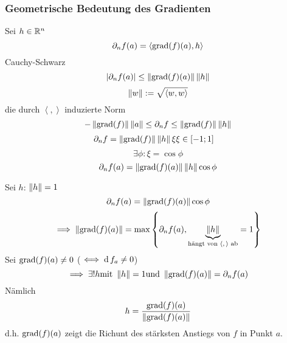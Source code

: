 \subsubsection{Geometrische Bedeutung des Gradienten}
\begin{Bem}
  Sei $h\in\mathbb{R}^n$
  \[\partial_n f(a)=\left\langle \operatorname{grad}(f)(a),h \right\rangle\]
  Cauchy-Schwarz
  \[\left| \partial_nf(a) \right|\leq\left\| \operatorname{grad}(f)(a) \right\|\left\| h \right\|\]
  \[\left\| w \right\|:=\sqrt{\left\langle w,w \right\rangle }\]
  die durch $\left\langle , \right\rangle$ induzierte Norm
  \[-\left\| \operatorname{grad}(f) \right\|\left\| a \right\|\leq \partial_n f\leq \left\| \operatorname{grad}(f) \right\|\left\| h \right\|\]
  \begin{align*}
    \partial_nf=\left\| \operatorname{grad}(f) \right\|\left\| h \right\|\xi&\xi\in [-1;1]
  \end{align*}
  \[\exists\phi:\xi=\cos\phi\]
  \[\partial_nf(a)=\left\| \operatorname{grad}(f)(a) \right\|\left\| h \right\|\cos \phi\]
\end{Bem}
\begin{Bem}
  Sei $h$: $\left\| h \right\|=1$
  \[\partial_nf(a)=\left\| \operatorname{grad}(f)(a) \right\|\cos \phi\]
  \[\implies\left\| \operatorname{grad}(f)(a) \right\|=\max\left\{ \partial_n f(a),\underbrace{\left\| h \right\|}_{\text{hängt von $\left\langle , \right\rangle$ ab}}=1 \right\}\]
  Sei $\operatorname{grad}(f)(a)\neq 0$ ($\iff \operatorname{d} f_a\neq 0$)
  \[\implies \exists !h\text{mit}\ \Norm{h}=1\text{und}\ \Norm{\grad f(a)}=\partial_n f(a)\]
  Nämlich
  \[h=\frac{\operatorname{grad}(f)(a)}{\left\| \operatorname{grad}(f)(a) \right\|}\]
  d.h. $\operatorname{grad}(f)(a)$ zeigt die Richunt des stärksten Anstiegs von $f$ in Punkt $a$.
\end{Bem}
